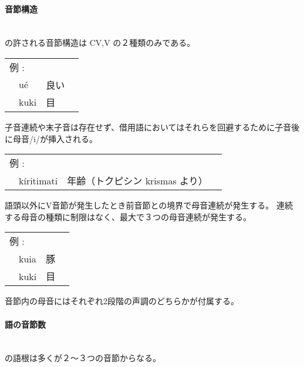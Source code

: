 \paragraph{音節構造}\quad\\
\langname の許される音節構造は CV,V の２種類のみである。

\begin{tabular}{llll}
    \multicolumn{2}{l}{例 : } \\ 
    & u\'e & 良い \\
    & kuki & 目 \\
\end{tabular}

子音連続や末子音は存在せず、借用語においてはそれらを回避するために子音後に母音/i/が挿入される。

\begin{tabular}{llll}
    \multicolumn{2}{l}{例 : } \\ 
    & k\'iritimati & 年齢（トクピシン krismas より） \\
\end{tabular}

語頭以外にV音節が発生したとき前音節との境界で母音連続が発生する。
連続する母音の種類に制限はなく、最大で３つの母音連続が発生する。

\begin{tabular}{llll}
    \multicolumn{2}{l}{例 : } \\ 
    & kuia & 豚 \\
    & kuki & 目 \\
\end{tabular}

音節内の母音にはそれぞれ2段階の声調のどちらかが付属する。

\paragraph{語の音節数}\quad\\
\langname の語根は多くが２～３つの音節からなる。

